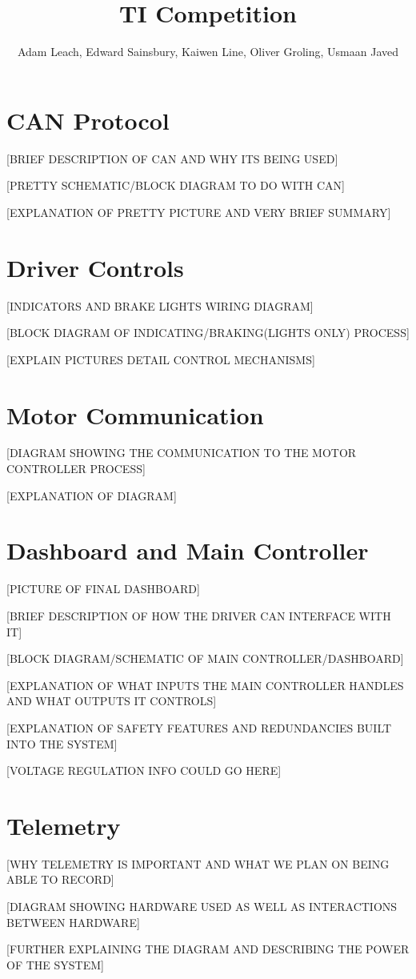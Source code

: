 \documentclass[10pt,a4paper]{article}
\begin{document}
\title{TI Competition}
\author{Adam Leach, Edward Sainsbury, Kaiwen Line, Oliver Groling, Usmaan Javed}
\maketitle
\tableofcontents
\section{CAN Protocol}
[BRIEF DESCRIPTION OF CAN AND WHY ITS BEING USED]

[PRETTY SCHEMATIC/BLOCK DIAGRAM TO DO WITH CAN]

[EXPLANATION OF PRETTY PICTURE AND VERY BRIEF SUMMARY]

\section{Driver Controls}
[INDICATORS AND BRAKE LIGHTS WIRING DIAGRAM]

[BLOCK DIAGRAM OF INDICATING/BRAKING(LIGHTS ONLY) PROCESS]

[EXPLAIN PICTURES DETAIL CONTROL MECHANISMS]

\section{Motor Communication}
[DIAGRAM SHOWING THE COMMUNICATION TO THE MOTOR CONTROLLER PROCESS]

[EXPLANATION OF DIAGRAM]

\section{Dashboard and Main Controller}
[PICTURE OF FINAL DASHBOARD]

[BRIEF DESCRIPTION OF HOW THE DRIVER CAN INTERFACE WITH IT]

[BLOCK DIAGRAM/SCHEMATIC OF MAIN CONTROLLER/DASHBOARD]

[EXPLANATION OF WHAT INPUTS THE MAIN CONTROLLER HANDLES AND WHAT OUTPUTS IT CONTROLS]

[EXPLANATION OF SAFETY FEATURES AND REDUNDANCIES BUILT INTO THE SYSTEM]

[VOLTAGE REGULATION INFO COULD GO HERE]

\section{Telemetry}
[WHY TELEMETRY IS IMPORTANT AND WHAT WE PLAN ON BEING ABLE TO RECORD]

[DIAGRAM SHOWING HARDWARE USED AS WELL AS INTERACTIONS BETWEEN HARDWARE]

[FURTHER EXPLAINING THE DIAGRAM AND DESCRIBING THE POWER OF THE SYSTEM]
\end{document}
